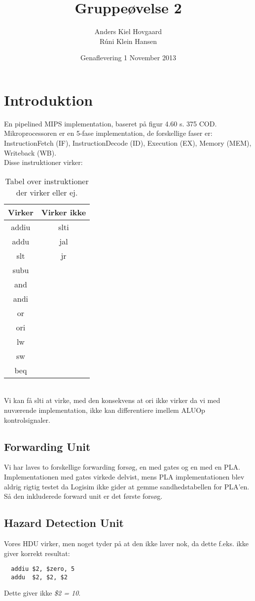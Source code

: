 \documentclass[12pt,a4paper,danish]{article}
\begin{document}
\title{Gruppeøvelse 2}
\author{Anders Kiel Hovgaard\\Rúni Klein Hansen}
\date{Genaflevering 1 November 2013}
\maketitle

\section{Introduktion}
En pipelined MIPS implementation, baseret på figur 4.60 s. 375 COD.\\
Mikroprocessoren er en 5-fase implementation, de forskellige faser er:
\textsf{InstructionFetch (IF), InstructionDecode (ID), Execution (EX), Memory (MEM),
Writeback (WB)}.\\ 
Disse instruktioner virker:
\begin{table}[h!]
  \centering
  \begin{tabular}{c|c}
    Virker& Virker ikke \\\hline
    addiu & slti        \\
    addu  & jal         \\
    slt   & jr          \\
    subu  &             \\
    and   &             \\
    andi  &             \\
    or    &             \\
    ori   &             \\
    lw    &             \\
    sw    &             \\
    beq   &             \\
  \end{tabular}
  \caption{Tabel over instruktioner der virker eller ej.}
  \label{tab:instr}
\end{table}
\\
Vi kan få \textsf{slti} at virke, med den konsekvens at \textsf{ori} ikke
virker da vi med nuværende implementation, ikke kan differentiere imellem ALUOp
kontrolsignaler. 

\subsection{Forwarding Unit}
Vi har laves to forskellige forwarding forsøg, en med gates og en med en PLA.
Implementationen med gates virkede delvist, mens PLA implementationen blev
aldrig rigtig testet da Logisim ikke gider at gemme sandhedstabellen for
PLA'en.\\
Så den inkluderede forward unit er det første forsøg.

\subsection{Hazard Detection Unit}
Vores HDU virker, men noget tyder på at den ikke laver nok, da dette f.eks. ikke
giver korrekt resultat:\\

\begin{verbatim}
  addiu $2, $zero, 5
  addu  $2, $2, $2
\end{verbatim}

\noindent Dette giver ikke \emph{\$2 = 10}.
\end{document}
